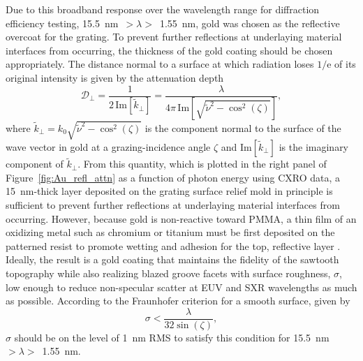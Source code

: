 \documentclass{aastex63}
\begin{document}
Due to this broadband response over the wavelength range for diffraction efficiency testing, 15.5~nm~$> \lambda >$~1.55~nm, gold was chosen as the reflective overcoat for the grating. 
To prevent further reflections at underlaying material interfaces from occurring, the thickness of the gold coating should be chosen appropriately. 
The distance normal to a surface at which radiation loses $1/\mathrm{e}$ of its original intensity is given by the attenuation depth \citep{Gibaud2009} 
\begin{equation}\label{eq:attn_depth}
 \mathcal{D}_{\perp} = \frac{1}{2 \, \text{Im} \! \left[ \tilde{k}_{\perp} \right]} = \frac{\lambda}{4 \pi \, \text{Im} \! \left[ \sqrt{\tilde{\nu}^2 - \cos^2 \left( \zeta \right)} \right]} ,
 \end{equation}
where $\tilde{k}_{\perp} = k_0 \sqrt{\tilde{\nu}^2 - \cos^2 \left( \zeta \right)}$ is the component normal to the surface of the wave vector in gold at a grazing-incidence angle $\zeta$ and $\text{Im} \! \left[ \tilde{k}_{\perp} \right]$ is the imaginary component of $\tilde{k}_{\perp}$. %
From this quantity, which is plotted in the right panel of Figure~\ref{fig:Au_refl_attn} as a function of photon energy using CXRO data, a 15~nm-thick layer deposited on the grating surface relief mold in principle is sufficient to prevent further reflections at underlaying material interfaces from occurring. 
However, because gold is non-reactive toward PMMA, a thin film of an oxidizing metal such as chromium or titanium must be first deposited on the patterned resist to promote wetting and adhesion for the top, reflective layer \citep{Trolier-McKinstry17}. 
Ideally, the result is a gold coating that maintains the fidelity of the sawtooth topography while also realizing blazed groove facets with surface roughness, $\sigma$, low enough to reduce non-specular scatter at EUV and SXR wavelengths as much as possible. 
According to the Fraunhofer criterion for a smooth surface, given by \citep{Beckmann63}
\begin{equation}\label{eq:roughness_inequality}
	\sigma < \frac{\lambda}{32 \sin \left( \zeta \right)} , 
 \end{equation}
$\sigma$ should be on the level of 1~nm RMS to satisfy this condition for 15.5~nm~$> \lambda >$~1.55~nm. 
\end{document}
